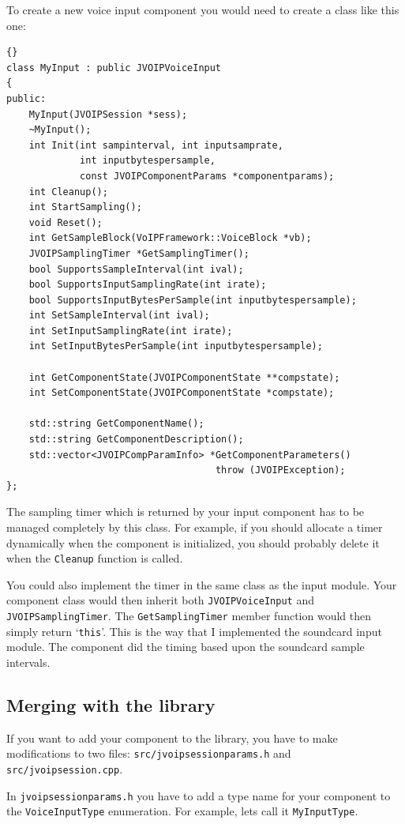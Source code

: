 		To create a new voice input component you would need to create a class
		like this one:
		\begin{lstlisting}[frame=tb]{}
class MyInput : public JVOIPVoiceInput
{
public:
	MyInput(JVOIPSession *sess);
	~MyInput();
	int Init(int sampinterval, int inputsamprate, 
	         int inputbytespersample,
	         const JVOIPComponentParams *componentparams);
	int Cleanup();
	int StartSampling();
	void Reset();
	int GetSampleBlock(VoIPFramework::VoiceBlock *vb);
	JVOIPSamplingTimer *GetSamplingTimer();
	bool SupportsSampleInterval(int ival);
	bool SupportsInputSamplingRate(int irate);
	bool SupportsInputBytesPerSample(int inputbytespersample);
	int SetSampleInterval(int ival);
	int SetInputSamplingRate(int irate);
	int SetInputBytesPerSample(int inputbytespersample);

	int GetComponentState(JVOIPComponentState **compstate);
	int SetComponentState(JVOIPComponentState *compstate);
	
	std::string GetComponentName();
	std::string GetComponentDescription();
	std::vector<JVOIPCompParamInfo> *GetComponentParameters() 
	                                 throw (JVOIPException);
};
		\end{lstlisting}
		The sampling timer which is returned by your input component has to
		be managed completely by this class. For example, if you should allocate
		a timer dynamically when the component is initialized, you should probably
		delete it when the {\tt Cleanup} function is called.
		
		You could also implement the timer in the same class as the input module.
		Your component class would then inherit both {\tt JVOIPVoiceInput} and
		{\tt JVOIPSamplingTimer}. The {\tt GetSamplingTimer} member function would
		then simply return `{\tt this}'. This is the way that I implemented the 
		soundcard input module. The component did the timing based upon the 
		soundcard sample intervals.
		
		\subsection{Merging with the library}
		
		If you want to add your component to the library, you have to make modifications
		to two files: {\tt src/jvoipsessionparams.h} and {\tt src/jvoipsession.cpp}.
		
		In {\tt jvoipsessionparams.h} you have to add a type name for your component
		to the {\tt VoiceInputType} enumeration. For example, lets call it {\tt MyInputType}.
		
